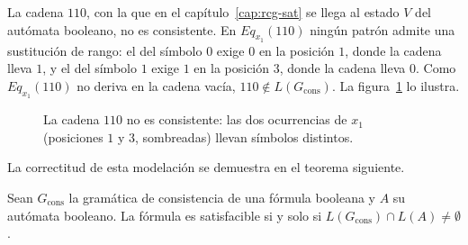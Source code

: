 La cadena $110$, con la que en el capítulo~\ref{cap:rcg-sat} se llega
al estado $V$ del autómata booleano, no es consistente. En
$Eq_{x_1}(110)$ ningún patrón admite una sustitución de rango: el del
símbolo $0$ exige $0$ en la posición $1$, donde la cadena lleva $1$, y
el del símbolo $1$ exige $1$ en la posición $3$, donde la cadena lleva
$0$.
Como $Eq_{x_1}(110)$ no deriva en la cadena vacía,
$110 \notin L(G_{\mathrm{cons}})$. La
figura~\ref{fig:no-consistencia-110} lo ilustra.

\begin{figure}[ht]
\centering
{}
\caption[La cadena $110$ no es consistente]{La cadena $110$ no es consistente: las dos ocurrencias de
$x_1$ (posiciones $1$ y $3$, sombreadas) llevan símbolos distintos.}
\label{fig:no-consistencia-110}
\end{figure}

La correctitud de esta modelación se demuestra en el teorema
siguiente.

\begin{teorema}
\label{teo:sat-vacio-interseccion}
Sean $G_{\mathrm{cons}}$ la gramática de consistencia de una fórmula
booleana y $A$ su autómata booleano. La fórmula es satisfacible si y
solo si $L(G_{\mathrm{cons}}) \cap L(A) \neq \emptyset$.
\end{teorema}

